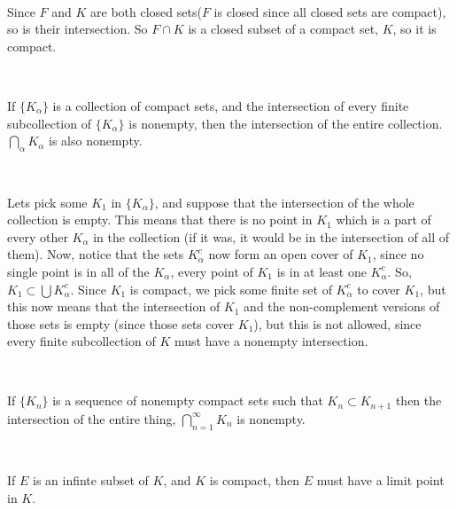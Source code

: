 \documentclass{article}
\begin{document}
\begin{customproof}
\

Since $F$ and $K$ are both closed sets($F$ is closed since all closed sets are compact), so is their intersection. So $F \cap K$ is a closed subset of a compact set, $K$, so it is compact.
\end{customproof}

\begin{theorem}
\

If $\{K_\alpha\}$ is a collection of compact sets, and the intersection of every finite subcollection of $\{K_\alpha\}$ is nonempty, then the intersection of the entire collection. $\bigcap_\alpha K_\alpha$ is also nonempty.
\end{theorem}

\begin{customproof}
\

Lets pick some $K_1$ in $\{K_\alpha\}$, and suppose that the intersection of the whole collection is empty. This means that there is no point in $K_1$ which is a part of every other $K_\alpha$ in the collection (if it was, it would be in the intersection of all of them). Now, notice that the sets $K^c_\alpha$ now form an open cover of $K_1$, since no single point is in all of the $K_\alpha$, every point of $K_1$ is in at least one $K_\alpha^c$. So, $K_1 \subset \bigcup K_\alpha^c$. Since $K_1$ is compact, we pick some finite set of $K_\alpha^c$ to cover $K_1$, but this now means that the intersection of $K_1$ and the non-complement versions of those sets is empty (since those sets cover $K_1$), but this is not allowed, since every finite subcollection of $K$ must have a nonempty intersection.
\end{customproof}

\begin{corollary}
\

If $\{K_n\}$ is a sequence of nonempty compact sets such that $K_n \subset K_{n+1}$ then the intersection of the entire thing, $\bigcap_{n=1}^\infty K_n$ is nonempty.
\end{corollary}

\begin{theorem}
\

If $E$ is an infinte subset of $K$, and $K$ is compact, then $E$ must have a limit point in $K$.
\end{theorem}
\end{document}
